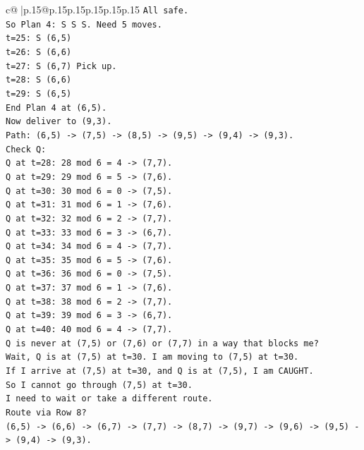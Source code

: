 \documentclass{article}
\begin{document}
{\begin{supertabular}{c@{$\;$}|p{.15\linewidth}@{}p{.15\linewidth}p{.15\linewidth}p{.15\linewidth}p{.15\linewidth}p{.15\linewidth}}
{{{\texttt{All safe.} \\
\texttt{So Plan 4: S S S. Need 5 moves.} \\
\texttt{t=25: S (6,5)} \\
\texttt{t=26: S (6,6)} \\
\texttt{t=27: S (6,7) Pick up.} \\
\texttt{t=28: S (6,6)} \\
\texttt{t=29: S (6,5)} \\
\texttt{End Plan 4 at (6,5).} \\
\texttt{Now deliver to (9,3).} \\
\texttt{Path: (6,5) {-}> (7,5) {-}> (8,5) {-}> (9,5) {-}> (9,4) {-}> (9,3).} \\
\texttt{Check Q:} \\
\texttt{Q at t=28: 28 mod 6 = 4 {-}> (7,7).} \\
\texttt{Q at t=29: 29 mod 6 = 5 {-}> (7,6).} \\
\texttt{Q at t=30: 30 mod 6 = 0 {-}> (7,5).} \\
\texttt{Q at t=31: 31 mod 6 = 1 {-}> (7,6).} \\
\texttt{Q at t=32: 32 mod 6 = 2 {-}> (7,7).} \\
\texttt{Q at t=33: 33 mod 6 = 3 {-}> (6,7).} \\
\texttt{Q at t=34: 34 mod 6 = 4 {-}> (7,7).} \\
\texttt{Q at t=35: 35 mod 6 = 5 {-}> (7,6).} \\
\texttt{Q at t=36: 36 mod 6 = 0 {-}> (7,5).} \\
\texttt{Q at t=37: 37 mod 6 = 1 {-}> (7,6).} \\
\texttt{Q at t=38: 38 mod 6 = 2 {-}> (7,7).} \\
\texttt{Q at t=39: 39 mod 6 = 3 {-}> (6,7).} \\
\texttt{Q at t=40: 40 mod 6 = 4 {-}> (7,7).} \\
\texttt{Q is never at (7,5) or (7,6) or (7,7) in a way that blocks me?} \\
\texttt{Wait, Q is at (7,5) at t=30. I am moving to (7,5) at t=30.} \\
\texttt{If I arrive at (7,5) at t=30, and Q is at (7,5), I am CAUGHT.} \\
\texttt{So I cannot go through (7,5) at t=30.} \\
\texttt{I need to wait or take a different route.} \\
\texttt{Route via Row 8?} \\
\texttt{(6,5) {-}> (6,6) {-}> (6,7) {-}> (7,7) {-}> (8,7) {-}> (9,7) {-}> (9,6) {-}> (9,5) {-}> (9,4) {-}> (9,3).} \\
}}}
\end{supertabular}}
\end{document}
